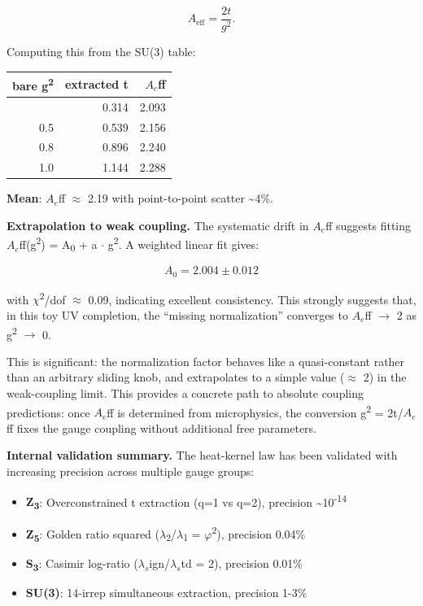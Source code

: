 \documentclass[11pt,a4paper]{article}
\theoremstyle{remark}
\providecommand{\tightlist}{%
  \setlength{\itemsep}{0pt}\setlength{\parskip}{0pt}}
\begin{document}
\[
A_\mathrm{eff} = \frac{2t}{g^2}.
\]

Computing this from the SU(3) table:

{\def\LTcaptype{none} %
\begin{longtable}[]{@{}rrr@{}}
\toprule\noalign{}
bare g\textsuperscript{2} & extracted t & \(A_e\)ff \\
\midrule\noalign{}
\endhead
\bottomrule\noalign{}
\endlastfoot
0.3 & 0.314 & 2.093 \\
0.5 & 0.539 & 2.156 \\
0.8 & 0.896 & 2.240 \\
1.0 & 1.144 & 2.288 \\
\end{longtable}
}

\textbf{Mean}: \(A_e\)ff \ensuremath{\approx} 2.19 with point-to-point scatter \textasciitilde4\%.

\textbf{Extrapolation to weak coupling.} The systematic drift in \(A_e\)ff
suggests fitting \(A_e\)ff(g\textsuperscript{2}) = A\textsubscript{0} + a \ensuremath{\cdot} g\textsuperscript{2}. A weighted linear
fit gives:

\[
A_0 = 2.004 \pm 0.012
\]

with \ensuremath{\chi}\textsuperscript{2}/dof \ensuremath{\approx} 0.09, indicating excellent consistency. This
strongly suggests that, in this toy UV completion, the ``missing normalization''
converges to \(A_e\)ff \ensuremath{\to} 2 as g\textsuperscript{2} \ensuremath{\to} 0.

This is significant: the normalization factor behaves like a quasi-constant
rather than an arbitrary sliding knob, and extrapolates to a simple value
(\ensuremath{\approx} 2) in the weak-coupling limit. This provides a concrete path to
absolute coupling predictions: once \(A_e\)ff is determined from
microphysics, the conversion g\textsuperscript{2} = 2t/\(A_e\)ff fixes the gauge
coupling without additional free parameters.

\textbf{Internal validation summary.} The heat-kernel law has been validated with
increasing precision across multiple gauge groups:

\begin{itemize}
\tightlist
\item
  \textbf{Z\textsubscript{3}}: Overconstrained t extraction (q=1 vs q=2), precision \textasciitilde10\textsuperscript{-14}
\item
  \textbf{Z\textsubscript{5}}: Golden ratio squared (\ensuremath{\lambda}\textsubscript{2}/\ensuremath{\lambda}\textsubscript{1} = \ensuremath{\varphi}\textsuperscript{2}), precision 0.04\%
\item
  \textbf{S\textsubscript{3}}: Casimir log-ratio (\(\ensuremath{\lambda}_s\)ign/\(\ensuremath{\lambda}_s\)td = 2), precision 0.01\%
\item
  \textbf{SU(3)}: 14-irrep simultaneous extraction, precision 1-3\%
\end{itemize}
\end{document}
